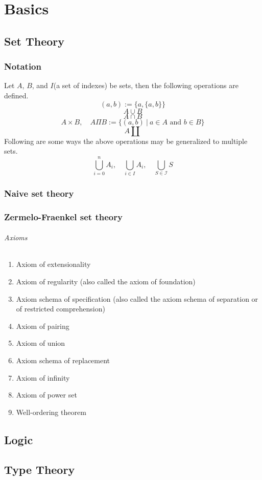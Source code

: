 \part{Basics}
\chapter{Set Theory}
\section{Notation}
Let $A$, $B$, and $I$(a set of indexes) be sets, then the following operations are defined.
$$(a,b) := \{a,\{a,b\}\}$$
$$A \cup B$$
$$A \cap B$$
$$A \times B, \quad A \Pi B := \{(a,b)\ |\ a \in A \text{ and } b \in B \} $$
$$A \amalg $$
Following are some ways the above operations may be generalized to multiple sets.
$$\bigcup_{i=0}^n A_i, \quad \bigcup_{i \in I} A_i, \quad \bigcup_{S \in \mathscr{I}} S $$

\section{Naive set theory}

\section{Zermelo-Fraenkel set theory}

\paragraph{Axioms}
\begin{enumerate}
\item Axiom of extensionality
\item Axiom of regularity (also called the axiom of foundation)
\item Axiom schema of specification (also called the axiom schema of separation or of restricted comprehension)
\item Axiom of pairing
\item Axiom of union
\item Axiom schema of replacement
\item Axiom of infinity
\item Axiom of power set
\item Well-ordering theorem
\end{enumerate}

\chapter{Logic}
\chapter{Type Theory}

